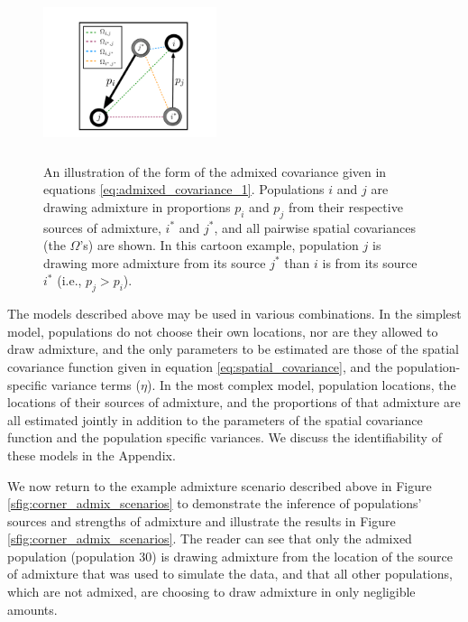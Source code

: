\documentclass[12pt]{article}
\newcommand{\identifyadmixsource}[1]{{#1^{*}}}
\newcommand{\plr}[1]{{\it\color{green}{(#1)}}}
\begin{document}
\begin{figure}[htp!]
	\centering
	\includegraphics[width=2in,height=2in]{figs/admix_cov_fig.pdf}
	\caption{An illustration of the form of the admixed covariance given in equations \eqref{eq:admixed_covariance_1}.  Populations $i$ and $j$ are drawing admixture in proportions $p_i$ and $p_j$ from their respective sources of admixture, $\identifyadmixsource{i}$ and $\identifyadmixsource{j}$, and all pairwise spatial covariances (the $\Omega$'s) are shown.  In this cartoon example, population $j$ is drawing more admixture from its source $\identifyadmixsource{j}$ than $i$ is from its source $\identifyadmixsource{i}$ (i.e., $p_j > p_i$).
        \plr{isn't $p_i>p_j$?}
    }
\label{sfig:admixed_cov_diagram}
\end{figure}


The models described above may be used in various combinations.  In the simplest model, populations do not choose their own locations, nor are they allowed to draw admixture, and the only parameters to be estimated are those of the spatial covariance function given in equation \eqref{eq:spatial_covariance}, and the population-specific variance terms ($\eta$).  In the most complex model, population locations, the locations of their sources of admixture, and the proportions of that admixture are all estimated jointly in addition to the parameters of the spatial covariance function and the population specific variances.  We discuss the identifiability of these models in the Appendix.

We now return to the example admixture scenario described above in Figure \ref{sfig:corner_admix_scenarios} to demonstrate the inference of populations' sources and strengths of admixture and illustrate the results in Figure \ref{sfig:corner_admix_scenarios}.  The reader can see that only the admixed population (population 30) is drawing admixture from the location of the source of admixture that was used to simulate the data, and that all other populations, which are not admixed, are choosing to draw admixture in only negligible amounts.
\end{document}
